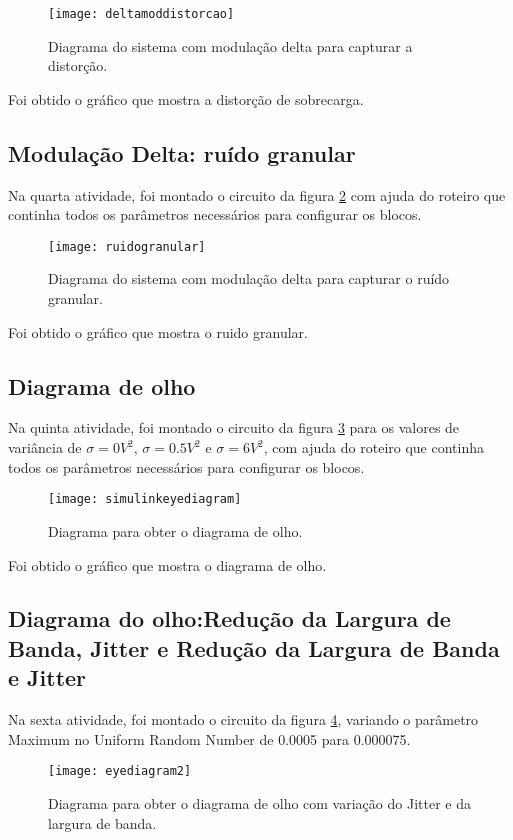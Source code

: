 \begin{figure}[H]
    \centering
    \texttt{[image: deltamoddistorcao]}
    \caption{Diagrama do sistema com modulação delta para capturar a distorção.}
    \label{fig:deltamoddistorcao}
\end{figure}

Foi obtido o gráfico que mostra a distorção de sobrecarga.

\subsection{Modulação Delta: ruído granular}
Na quarta atividade, foi montado o circuito da figura \ref{fig:ruido} com ajuda do roteiro que continha todos os parâmetros necessários para configurar os blocos.

\begin{figure}[H]
    \centering
    \texttt{[image: ruidogranular]}
    \caption{Diagrama do sistema com modulação delta para capturar o ruído granular.}
    \label{fig:ruido}
\end{figure}

Foi obtido o gráfico que mostra o ruido granular.

\subsection{Diagrama de olho}
Na quinta atividade, foi montado o circuito da figura \ref{fig:eyediagram1} para os valores de variância de $\sigma =0 V^2$, $\sigma =0.5 V^2$ e $\sigma =6 V^2$, com ajuda do roteiro que continha todos os parâmetros necessários para configurar os blocos.

\begin{figure}[H]
    \centering
    \texttt{[image: simulinkeyediagram]}
    \caption{Diagrama para obter o diagrama de olho.}
    \label{fig:eyediagram1}
\end{figure}

Foi obtido o gráfico que mostra o diagrama de olho.


\subsection{Diagrama do olho:Redução da Largura de Banda, Jitter e Redução da Largura de Banda e Jitter}
Na sexta atividade, foi montado o circuito da figura \ref{fig:eyediagram2}, variando o parâmetro Maximum no Uniform Random Number de 0.0005 para 0.000075.

\begin{figure}[H]
    \centering
    \texttt{[image: eyediagram2]}
    \caption{Diagrama para obter o diagrama de olho com variação do Jitter e da largura de banda.}
    \label{fig:eyediagram2}
\end{figure}

